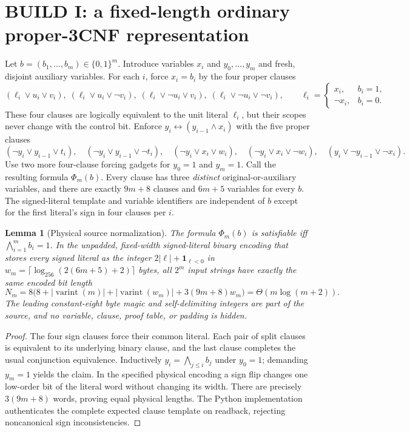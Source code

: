 \documentclass[11pt]{article}
\newtheorem{lemma}[theorem]{Lemma}
\begin{document}
\section{BUILD I: a fixed-length ordinary proper-3CNF representation}
Let $b=(b_1,\ldots,b_m)\in\{0,1\}^m$. Introduce variables $x_i$ and $y_0,\ldots,y_m$ and fresh, disjoint auxiliary variables. For each $i$, force $x_i=b_i$ by the four proper clauses
\[
 (\ell_i\vee u_i\vee v_i),\; (\ell_i\vee u_i\vee\neg v_i),\;
 (\ell_i\vee\neg u_i\vee v_i),\; (\ell_i\vee\neg u_i\vee\neg v_i),
 \qquad \ell_i=\begin{cases}x_i,& b_i=1,\\\neg x_i,&b_i=0.\end{cases}
\]
These four clauses are logically equivalent to the unit literal $\ell_i$, but their scopes never change with the control bit. Enforce $y_i\leftrightarrow(y_{i-1}\wedge x_i)$ with the five proper clauses
\[
 (\neg y_i\vee y_{i-1}\vee t_i),\quad
 (\neg y_i\vee y_{i-1}\vee\neg t_i),\quad
 (\neg y_i\vee x_i\vee w_i),\quad
 (\neg y_i\vee x_i\vee\neg w_i),\quad
 (y_i\vee\neg y_{i-1}\vee\neg x_i).
\]
Use two more four-clause forcing gadgets for $y_0=1$ and $y_m=1$. Call the resulting formula $\Phi_m(b)$. Every clause has three \emph{distinct} original-or-auxiliary variables, and there are exactly $9m+8$ clauses and $6m+5$ variables for every $b$. The signed-literal template and variable identifiers are independent of $b$ except for the first literal's sign in four clauses per $i$.

\begin{lemma}[Physical source normalization]\label{lem:cnf}
The formula $\Phi_m(b)$ is satisfiable iff $\bigwedge_{i=1}^m b_i=1$. In the unpadded, fixed-width signed-literal binary encoding that stores every signed literal as the integer $2|\ell|+\mathbf1_{\ell<0}$ in $w_m=\lceil\log_{256}(2(6m+5)+2)\rceil$ bytes, all $2^m$ input strings have exactly the same encoded bit length
\[
 N_m=8\bigl(8+|\operatorname{varint}(m)|+|\operatorname{varint}(w_m)|+3(9m+8)w_m\bigr)=\Theta(m\log(m+2)).
\]
The leading constant-eight byte magic and self-delimiting integers are part of the source, and no variable, clause, proof table, or padding is hidden.
\end{lemma}
\begin{proof}
The four sign clauses force their common literal. Each pair of split clauses is equivalent to its underlying binary clause, and the last clause completes the usual conjunction equivalence. Inductively $y_i=\bigwedge_{j\le i}b_j$ under $y_0=1$; demanding $y_m=1$ yields the claim. In the specified physical encoding a sign flip changes one low-order bit of the literal word without changing its width. There are precisely $3(9m+8)$ words, proving equal physical lengths. The Python implementation authenticates the complete expected clause template on readback, rejecting noncanonical sign inconsistencies.
\end{proof}
\end{document}
